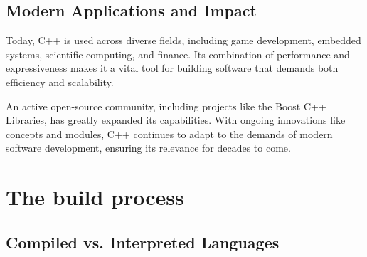 \subsection{Modern Applications and Impact}

Today, C++ is used across diverse fields, including game development, embedded systems, scientific computing, and finance. Its combination of performance and expressiveness makes it a vital tool for building software that demands both efficiency and scalability. 

An active open-source community, including projects like the Boost C++ Libraries, has greatly expanded its capabilities. With ongoing innovations like concepts and modules, C++ continues to adapt to the demands of modern software development, ensuring its relevance for decades to come.

\section{The build process}

\subsection{Compiled vs. Interpreted Languages}


